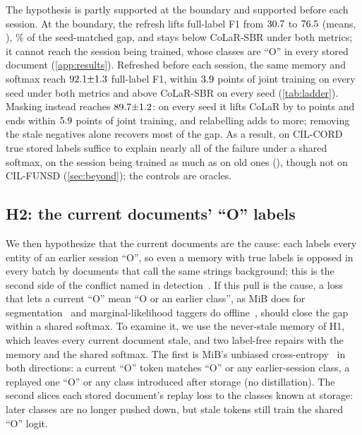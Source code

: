 \documentclass[10pt,twocolumn,letterpaper]{article}
\begin{document}
The hypothesis is partly supported at the boundary and supported before each session. At the boundary, the refresh lifts full-label F1 from $30.7$ to $76.5$ (means, \nOracleScope), \nOracleShareFull\% of the seed-matched gap, and stays below CoLaR-SBR under both metrics; it cannot reach the session being trained, whose classes are ``O'' in every stored document (\cref{app:results}). Refreshed before each session, the same memory and softmax reach $92.1{\pm}1.3$ full-label F1, within $3.9$ points of joint training on every seed under both metrics and above CoLaR-SBR on every seed (\cref{tab:ladder}). Masking instead reaches $89.7{\pm}1.2$: on every seed it lifts CoLaR by \nOracleMaskMinusColarFullMin{} to \nOracleMaskMinusColarFullMax{} points and ends within $5.9$ points of joint training, and relabelling adds \nOraclePreMinusMaskFullMin{} to \nOraclePreMinusMaskFullMax{} more; removing the stale negatives alone recovers most of the gap. As a result, on CIL-CORD true stored labels suffice to explain nearly all of the failure under a shared softmax, on the session being trained as much as on old ones (\nOracleN), though not on CIL-FUNSD (\cref{sec:beyond}); the controls are oracles.

\subsection{H2: the current documents' ``O'' labels}
\label{sec:h2}
We then hypothesize that the current documents are the cause: each labels every entity of an earlier session ``O'', so even a memory with true labels is opposed in every batch by documents that call the same strings background; this is the second side of the conflict named in detection~\citep{mo2024bpf}. If this pull is the cause, a loss that lets a current ``O'' mean ``O or an earlier class'', as MiB does for segmentation~\citep{cermelli2020mib} and marginal-likelihood taggers do offline~\citep{greenberg2018marginal}, should close the gap within a shared softmax. To examine it, we use the never-stale memory of H1, which leaves every current document stale, and two label-free repairs with the memory and the shared softmax. The first is MiB's unbiased cross-entropy~\citep{cermelli2020mib} in both directions: a current ``O'' token matches ``O'' or any earlier-session class, a replayed one ``O'' or any class introduced after storage (no distillation). The second slices each stored document's replay loss to the classes known at storage: later classes are no longer pushed down, but stale tokens still train the shared ``O'' logit.
\end{document}
